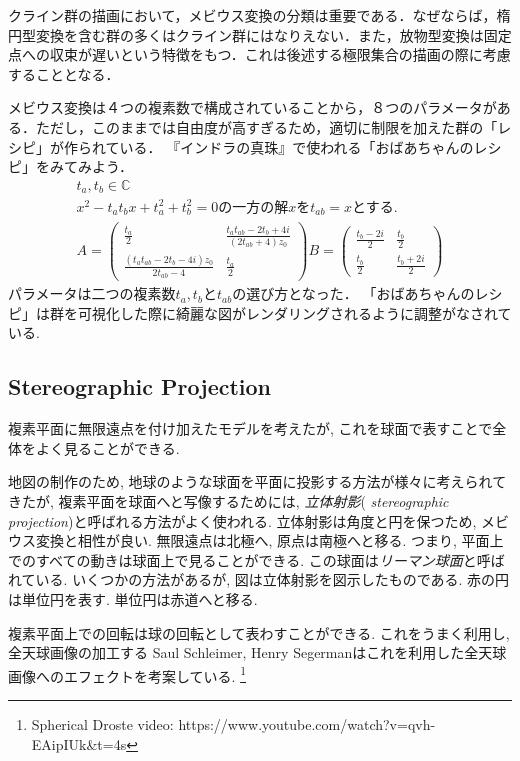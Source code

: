 クライン群の描画において，メビウス変換の分類は重要である．なぜならば，楕円型変換を含む群の多くはクライン群にはなりえない．また，放物型変換は固定点への収束が遅いという特徴をもつ．これは後述する極限集合の描画の際に考慮することとなる．

メビウス変換は４つの複素数で構成されていることから，８つのパラメータがある．ただし，このままでは自由度が高すぎるため，適切に制限を加えた群の「レシピ」が作られている．
『インドラの真珠』で使われる「おばあちゃんのレシピ」をみてみよう．
\begin{eqnarray*}
 t_a, t_b \in \mathbb{C} \\
 x^2 - t_a t_b x + t_a^2 + t_b^2 = 0 \text{の一方の解}x\text{を}t_{ab} = x \text{とする. }\\
 A = \left(
      \begin{array}{ccc}
       \frac{t_a}{2} & \frac{t_a t_{ab} - 2 t_b + 4i}{(2 t_{ab} + 4)z_0} \\
       \frac{(t_a t_{ab} - 2 t_b -4i)z_0}{2 t_{ab} - 4} & \frac{t_a}{2}
      \end{array}
     \right)
 B = \left(
      \begin{array}{ccc}
       \frac{t_b - 2i}{2} & \frac{t_b}{2} \\
       \frac{t_b}{2} & \frac{t_b + 2i}{2}
      \end{array}
     \right)
\end{eqnarray*}
パラメータは二つの複素数$t_a, t_b$と$t_{ab}$の選び方となった．
「おばあちゃんのレシピ」は群を可視化した際に綺麗な図がレンダリングされるように調整がなされている.

\subsection{Stereographic Projection}

複素平面に無限遠点を付け加えたモデルを考えたが, これを球面で表すことで全
体をよく見ることができる.

地図の制作のため, 地球のような球面を平面に投影する方法が様々に考えられて
きたが, 複素平面を球面へと写像するためには, \emph{立体射影}({\it
stereographic projection})と呼ばれる方法がよく使われる.
立体射影は角度と円を保つため, メビウス変換と相性が良い.
無限遠点は北極へ, 原点は南極へと移る.
つまり, 平面上でのすべての動きは球面上で見ることができる.
この球面は\emph{リーマン球面}と呼ばれている.
いくつかの方法があるが,
図は立体射影を図示したものである.
赤の円は単位円を表す. 単位円は赤道へと移る.

複素平面上での回転は球の回転として表わすことができる.
これをうまく利用し, 全天球画像の加工する
Saul Schleimer, Henry Segermanはこれを利用した全天球画像へのエフェクトを考案している\cite{spherical}.
\footnote{Spherical Droste video: https://www.youtube.com/watch?v=qvh-EAipIUk\&t=4s}


